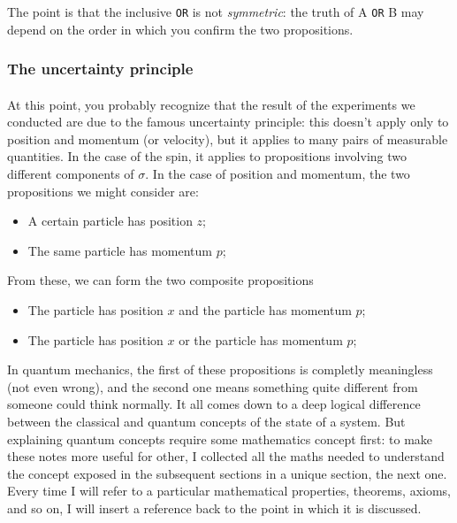 \documentclass[a4paper,10pt]{article}
\begin{document}
The point is that the inclusive \texttt{OR} is not \textit{symmetric}: the truth of A \texttt{OR} B may depend on the order in which you confirm the two propositions.

\subsubsection{The uncertainty principle}

\paragraph{} At this point, you probably recognize that the result of the experiments we conducted are due to the famous uncertainty principle: this doesn't apply only to position and momentum (or velocity), but it applies to many pairs of measurable quantities. In the case of the spin, it applies to propositions involving two different components of $\sigma$. In the case of position and momentum, the two propositions we might consider are:
\begin{itemize}
    \item A certain particle has position $z$;
    \item The same particle has momentum $p$;    
\end{itemize}

From these, we can form the two composite propositions
\begin{itemize}
    \item The particle has position $x$ and the particle has momentum $p$;
    \item The particle has position $x$ or the particle has momentum $p$;
\end{itemize}

In quantum mechanics, the first of these propositions is completly meaningless (not even wrong), and the second one means something quite different from someone could think normally. It all comes down to a deep logical difference between the classical and quantum concepts of the state of a system. But explaining quantum concepts require some mathematics concept first: to make these notes more useful for other, I collected all the maths needed to understand the concept exposed in the subsequent sections in a unique section, the next one. Every time I will refer to a particular mathematical properties, theorems, axioms, and so on, I will insert a reference back to the point in which it is discussed.

\newpage
\end{document}
